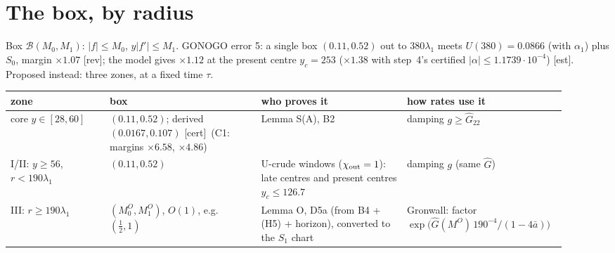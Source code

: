 \documentclass[11pt]{article}
\theoremstyle{remark}\newtheorem{remark}[theorem]{Remark}
\newcommand{\tC}{\textup{[cert]}}\newcommand{\tE}{\textup{[est]}}\newcommand{\tP}{\textup{[paper]}}
\begin{document}
\section{The box, by radius}\label{sec:box}
Box $\mathcal B(M_0,M_1)$: $|f|\le M_0$, $y|f'|\le M_1$. GONOGO error 5: a single box $(0.11,0.52)$ out to $380\lambda_1$ meets $U(380)=0.0866$ (with $\alpha_1$) plus $S_0$, margin $\times1.07$ [rev]; the model gives $\times1.12$ at the present centre $y_c=253$ ($\times1.38$ with step~4's certified $|\alpha|\le1.1739\cdot10^{-4}$) \tE. Proposed instead: three zones, at a fixed time $\tau$.
\begin{center}\small\begin{tabular}{@{}p{0.17\linewidth}p{0.26\linewidth}p{0.25\linewidth}p{0.24\linewidth}@{}}\toprule
zone & box & who proves it & how rates use it\\\midrule
core $y\in[28,60]$ & $(0.11,0.52)$; derived $(0.0167,0.107)$ \tC\ (C1: margins $\times6.58$, $\times4.86$) & Lemma S(A), B2 & damping $g\ge\hat G_{22}$\\
I/II: $y\ge56$, $r<190\lambda_1$ & $(0.11,0.52)$ & U-crude windows ($\chi_{\rm out}=1$): late centres and present centres $y_c\le126.7$ & damping $g$ (same $\hat G$)\\
III: $r\ge190\lambda_1$ & $(M_0^O,M_1^O)$, $O(1)$, e.g.\ $(\frac12,1)$ & Lemma O, D5a (from B4 + (H5) + horizon), converted to the $S_1$ chart & Gronwall: factor $\exp\bigl(\hat G(M^O)\,190^{-4}/(1-4\bar a)\bigr)$\\\bottomrule
\end{tabular}\end{center}
\end{document}

